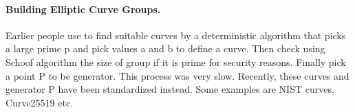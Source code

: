 \paragraph{Building Elliptic Curve Groups.} Earlier people use to find suitable curves by a deterministic algorithm that picks a large prime p and pick values a and b to define a curve. Then check using Schoof algorithm the size of group if it is prime for security reasons. Finally pick a point P to be generator. This process was very slow. Recently, these curves and generator P have been standardized instead. Some examples are NIST curves, Curve25519 etc. 







